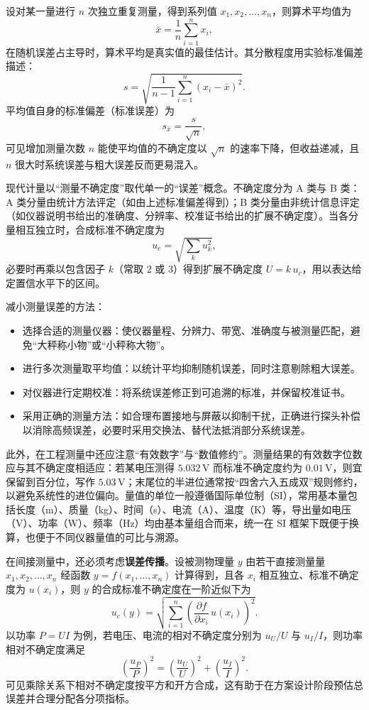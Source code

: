 设对某一量进行 $n$ 次独立重复测量，得到系列值 $x_1, x_2, \ldots, x_n$，则算术平均值为
\[
    \bar{x} = \frac{1}{n}\sum_{i=1}^{n} x_i ,
\]
在随机误差占主导时，算术平均是真实值的最佳估计。其分散程度用实验标准偏差描述：
\[
    s = \sqrt{\frac{1}{n-1}\sum_{i=1}^{n} \left( x_i - \bar{x} \right)^2 } .
\]
平均值自身的标准偏差（标准误差）为
\[
    s_{\bar{x}} = \frac{s}{\sqrt{n}} ,
\]
可见增加测量次数 $n$ 能使平均值的不确定度以 $\sqrt{n}$ 的速率下降，但收益递减，且 $n$ 很大时系统误差与粗大误差反而更易混入。

现代计量以“测量不确定度”取代单一的“误差”概念。不确定度分为 A 类与 B 类：A 类分量由统计方法评定（如由上述标准偏差得到）；B 类分量由非统计信息评定（如仪器说明书给出的准确度、分辨率、校准证书给出的扩展不确定度）。当各分量相互独立时，合成标准不确定度为
\[
    u_c = \sqrt{ \sum_{k} u_k^2 } ,
\]
必要时再乘以包含因子 $k$（常取 2 或 3）得到扩展不确定度 $U = k\,u_c$，用以表达给定置信水平下的区间。

减小测量误差的方法：
\begin{itemize}
    \item 选择合适的测量仪器：使仪器量程、分辨力、带宽、准确度与被测量匹配，避免“大秤称小物”或“小秤称大物”。
    \item 进行多次测量取平均值：以统计平均抑制随机误差，同时注意剔除粗大误差。
    \item 对仪器进行定期校准：将系统误差修正到可追溯的标准，并保留校准证书。
    \item 采用正确的测量方法：如合理布置接地与屏蔽以抑制干扰，正确进行探头补偿以消除高频误差，必要时采用交换法、替代法抵消部分系统误差。
\end{itemize}

此外，在工程测量中还应注意“有效数字”与“数值修约”。测量结果的有效数字位数应与其不确定度相适应：若某电压测得 $5.032\,\mathrm{V}$ 而标准不确定度约为 $0.01\,\mathrm{V}$，则宜保留到百分位，写作 $5.03\,\mathrm{V}$；末尾位的半进位通常按“四舍六入五成双”规则修约，以避免系统性的进位偏向。量值的单位一般遵循国际单位制（SI），常用基本量包括长度（m）、质量（kg）、时间（s）、电流（A）、温度（K）等，导出量如电压（V）、功率（W）、频率（Hz）均由基本量组合而来，统一在 SI 框架下既便于换算，也便于不同仪器量值的可比与溯源。

在间接测量中，还必须考虑\textbf{误差传播}。设被测物理量 $y$ 由若干直接测量量 $x_1, x_2, \ldots, x_n$ 经函数 $y=f(x_1,\ldots,x_n)$ 计算得到，且各 $x_i$ 相互独立、标准不确定度为 $u(x_i)$，则 $y$ 的合成标准不确定度在一阶近似下为
\[
    u_c(y) = \sqrt{ \sum_{i=1}^{n} \left( \frac{\partial f}{\partial x_i}\, u(x_i) \right)^2 } .
\]
以功率 $P=U I$ 为例，若电压、电流的相对不确定度分别为 $u_U/U$ 与 $u_I/I$，则功率相对不确定度满足
\[
    \left(\frac{u_P}{P}\right)^2 = \left(\frac{u_U}{U}\right)^2 + \left(\frac{u_I}{I}\right)^2 .
\]
可见乘除关系下相对不确定度按平方和开方合成，这有助于在方案设计阶段预估总误差并合理分配各分项指标。

